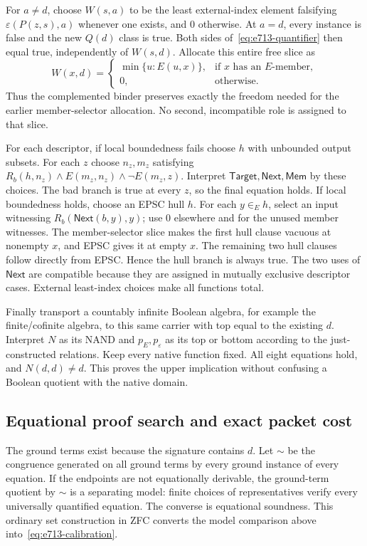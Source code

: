 For $a\ne d$, choose $W(s,a)$ to be the least external-index element
falsifying $\varepsilon(P(z,s),a)$ whenever one exists, and 0 otherwise.
At $a=d$, every instance is false and the new $Q(d)$ class is true.
Both sides of~\eqref{eq:e713-quantifier} then equal true, independently
of $W(s,d)$. Allocate this entire free slice as
\[
 W(x,d)=\begin{cases}
   \min\{u:E(u,x)\},&\text{if $x$ has an $E$-member},\\
   0,&\text{otherwise}.
 \end{cases}
\]
Thus the complemented binder preserves exactly the freedom needed for
the earlier member-selector allocation. No second, incompatible role is
assigned to that slice.

For each descriptor, if local boundedness fails choose $h$ with
unbounded output subsets. For each $z$ choose $n_z,m_z$ satisfying
$R_b(h,n_z)\land E(m_z,n_z)\land\neg E(m_z,z)$. Interpret
$\mathsf{Target},\mathsf{Next},\mathsf{Mem}$ by these choices. The bad
branch is true at every $z$, so the final equation holds. If local
boundedness holds, choose an EPSC hull $h$. For each $y\in_E h$, select
an input witnessing $R_b(\mathsf{Next}(b,y),y)$; use 0 elsewhere and
for the unused member witnesses. The member-selector slice makes the
first hull clause vacuous at nonempty $x$, and EPSC gives it at empty
$x$. The remaining two hull clauses follow directly from EPSC. Hence
the hull branch is always true. The two uses of $\mathsf{Next}$ are
compatible because they are assigned in mutually exclusive descriptor
cases. External least-index choices make all functions total.

Finally transport a countably infinite Boolean algebra, for example the
finite/cofinite algebra, to this same carrier with top equal to the
existing $d$. Interpret $N$ as its NAND and $p_E,p_\varepsilon$ as its
top or bottom according to the just-constructed relations. Keep every
native function fixed. All eight equations hold, and $N(d,d)\ne d$.
This proves the upper implication without confusing a Boolean quotient
with the native domain.

\subsection{Equational proof search and exact packet cost}

The ground terms exist because the signature contains $d$. Let $\sim$
be the congruence generated on all ground terms by every ground instance
of every equation. If the endpoints are not equationally derivable,
the ground-term quotient by $\sim$ is a separating model: finite choices
of representatives verify every universally quantified equation. The
converse is equational soundness. This ordinary set construction in ZFC
converts the model comparison above into~\eqref{eq:e713-calibration}.

